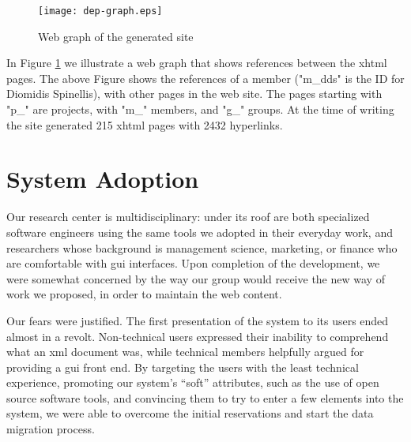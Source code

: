 \documentclass[10pt]{article}
\begin{document}
\begin{figure}
\texttt{[image: dep-graph.eps]}
\caption{Web graph of the generated site}
\label{fig:eltrun-web-m-dds-snapshot}
\end{figure}

In Figure \ref{fig:eltrun-web-m-dds-snapshot} we illustrate a web graph \cite{KRRSTU00} 
that shows references between the {\sc xhtml} pages.
The above Figure shows the references  of a member ("m\_dds" is the ID for 
Diomidis Spinellis), with other pages in the web site.
The pages starting with "p\_" are projects, with "m\_" members, and "g\_" groups.
At the time of writing the site generated 215 {\sc xhtml} pages with 2432 hyperlinks. 

\section{System Adoption}
\label{sec:adopt}

Our research center is multidisciplinary: under its roof
are both specialized software engineers using the same tools
we adopted in their everyday work, and researchers whose
background is management science, marketing, or finance
who are comfortable with {\sc gui} interfaces.
Upon completion of the development, we were somewhat concerned by the way our group
would receive the new way of work we proposed, in order to maintain the web content.

Our fears were justified.
The first presentation of the system to its users ended
almost in a revolt.
Non-technical users expressed their inability to comprehend
what an {\sc xml} document was, while technical members
helpfully argued for providing a {\sc gui} front end.
By targeting the users with the least technical experience,
promoting our system's ``soft'' attributes,
such as the use of open source software tools,
and convincing them to try to enter a few elements into
the system, we were able to overcome the initial reservations
and start the data migration process.
\end{document}
